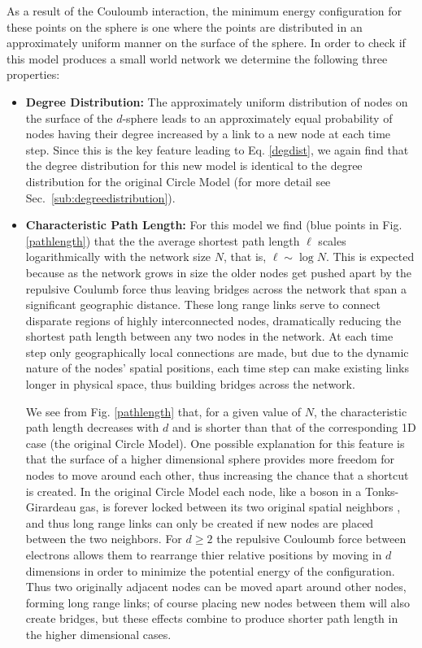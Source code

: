 \documentclass[aps,pre,reprint,superscriptaddress,amsmath,amssymb,nofootinbib]{revtex4-1}
\begin{document}
As a result of the Couloumb interaction, the minimum energy configuration for these points on the sphere is one where the points are distributed in an approximately uniform manner on the surface of the sphere.
In order to check if this model produces a small world network we determine the following three properties:
\begin{itemize}
  \item \textbf{Degree Distribution:} The approximately uniform distribution of nodes on the surface of the $d$-sphere leads to an approximately equal probability of nodes having their degree increased by a link to a new node at each time step.
Since this is the key feature leading to Eq. \eqref{degdist}, we again find that the degree distribution for this new model is identical to the degree distribution for the original Circle Model (for more detail see Sec.~\ref{sub:degreedistribution}).
  \item \textbf{Characteristic Path Length:} For this model we find (blue points in Fig. \ref{pathlength}) that the the average shortest path length $\ell$ scales logarithmically with the network size $N$, that is, $\ell \sim \log N$. 
This is expected because as the network grows in size the older nodes get pushed apart by the repulsive Coulumb force thus leaving bridges across the network that span a significant geographic distance.
These long range links serve to connect disparate regions of highly interconnected nodes, dramatically reducing the shortest path length between any two nodes in the network.
At each time step only geographically local connections are made, but due to the dynamic nature of the nodes' spatial positions, each time step can make existing links longer in physical space, thus building bridges across the network.

We see from Fig. \ref{pathlength} that, for a given value of $N$, the characteristic path length decreases with $d$ and is shorter than that of the corresponding 1D case (the original Circle Model).
One possible explanation for this feature is that the surface of a higher dimensional sphere provides more freedom for nodes to move around each other, thus increasing the chance that a shortcut is created.
In the original Circle Model each node, like a boson in a Tonks-Girardeau gas, is forever locked between its two original spatial neighbors \cite{girardeau}, and thus long range links can only be created if new nodes are placed between the two neighbors.
For $d \geq 2$ the repulsive Couloumb force between electrons allows them to rearrange thier relative positions by moving in $d$ dimensions in order to minimize the potential energy of the configuration.
Thus two originally adjacent nodes can be moved apart around other nodes, forming long range links; of course placing new nodes between them will also create bridges, but these effects combine to produce shorter path length in the higher dimensional cases.


\end{itemize}
\end{document}
